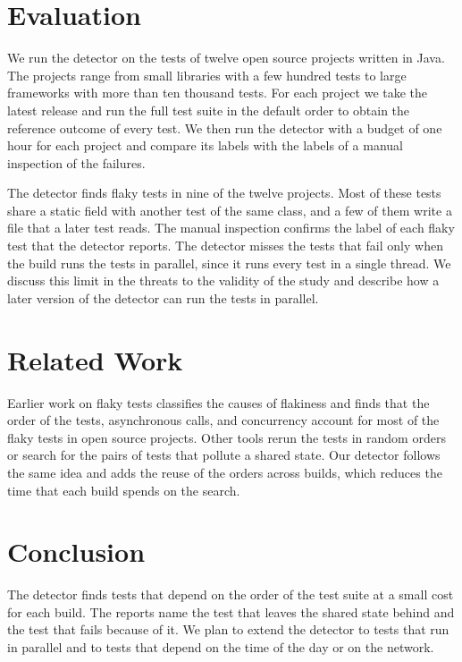 \section{Evaluation}
We run the detector on the tests of twelve open source projects written in Java. The projects range from small
libraries with a few hundred tests to large frameworks with more than ten thousand tests. For each project we take
the latest release and run the full test suite in the default order to obtain the reference outcome of every test.
We then run the detector with a budget of one hour for each project and compare its labels with the labels of a
manual inspection of the failures.

The detector finds flaky tests in nine of the twelve projects. Most of these tests share a static field with another
test of the same class, and a few of them write a file that a later test reads. The manual inspection confirms the
label of each flaky test that the detector reports. The detector misses the tests that fail only when the build runs
the tests in parallel, since it runs every test in a single thread. We discuss this limit in the threats to the
validity of the study and describe how a later version of the detector can run the tests in parallel.

\section{Related Work}
Earlier work on flaky tests classifies the causes of flakiness and finds that the order of the tests, asynchronous
calls, and concurrency account for most of the flaky tests in open source projects. Other tools rerun the tests in
random orders or search for the pairs of tests that pollute a shared state. Our detector follows the same idea and
adds the reuse of the orders across builds, which reduces the time that each build spends on the search.

\section{Conclusion}
The detector finds tests that depend on the order of the test suite at a small cost for each build. The reports name
the test that leaves the shared state behind and the test that fails because of it. We plan to extend the detector
to tests that run in parallel and to tests that depend on the time of the day or on the network.
